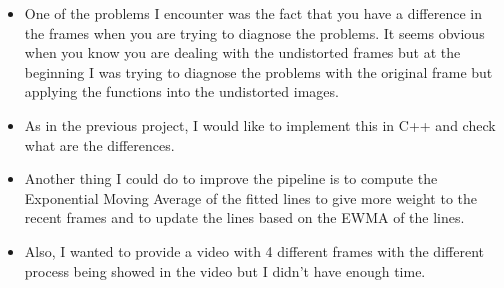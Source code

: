 \documentclass[11pt, a4paper]{article}
\begin{document}
\begin{itemize}
	\item One of the problems I encounter was the fact that you have a difference in the frames when you are trying to diagnose the problems. It seems obvious when you know you are dealing with the undistorted frames but at the beginning I was trying to diagnose the problems with the original frame but applying the functions into the undistorted images.
	\item As in the previous project, I would like to implement this in C++ and check what are the differences.
	\item Another thing I could do to improve the pipeline is to compute the Exponential Moving Average of the fitted lines to give more weight to the recent frames and to update the lines based on the EWMA of the lines.
	\item Also, I wanted to provide a video with 4 different frames with the different process being showed in the video but I didn't have enough time.
\end{itemize}
\end{document}
